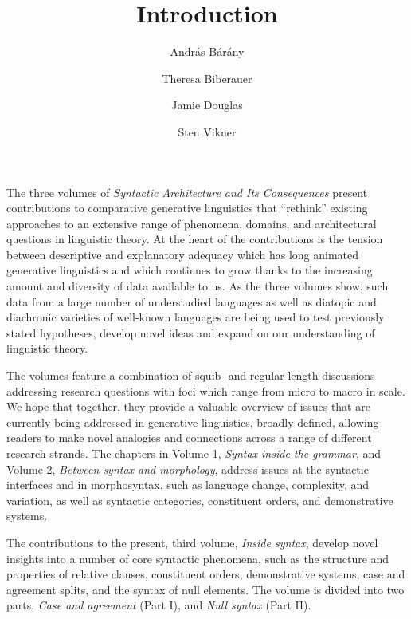 \documentclass[output=paper]{langsci/langscibook}
\author{András Bárány\affiliation{Leiden University}\and
        Theresa Biberauer\affiliation{University of Cambridge, Stellenbosch
        University, University of the West Cape}\and
        Jamie Douglas\and
        Sten Vikner\affiliation{Aarhus University}}
\title{Introduction}
\begin{document}
\noindent The three volumes of \emph{Syntactic Architecture and Its
Consequences} present contributions to comparative generative linguistics that
\enquote{rethink} existing approaches to an extensive range of phenomena,
domains, and architectural questions in linguistic theory. At the heart of the
contributions is the tension between descriptive and explanatory adequacy which
has long animated generative linguistics and which continues to grow thanks to
the increasing amount and diversity of data available to us. As the three
volumes show, such data from a large number of understudied languages as well
as diatopic and diachronic varieties of well-known languages are being used to
test previously stated hypotheses, develop novel ideas and expand on our
understanding of linguistic theory.

The volumes feature a combination of squib- and regular-length discussions
addressing research questions with foci which range from micro to macro in
scale. We hope that together, they provide a valuable overview of issues that
are currently being addressed in generative linguistics, broadly defined,
allowing readers to make novel analogies and connections across a range of
different research strands. The chapters in Volume 1, \emph{Syntax inside the
grammar}, and Volume 2, \emph{Between syntax and morphology}, address issues at
the syntactic interfaces and in morphosyntax, such as language change,
complexity, and variation, as well as syntactic categories, constituent orders,
and demonstrative systems.

The contributions to the present, third volume, \emph{Inside syntax}, develop
novel insights into a number of core syntactic phenomena, such as the structure
and properties of relative clauses, constituent orders, demonstrative systems,
case and agreement splits, and the syntax of null elements. The volume is
divided into two parts, \emph{Case and agreement} (Part I), and \emph{Null
syntax} (Part II).
\end{document}
